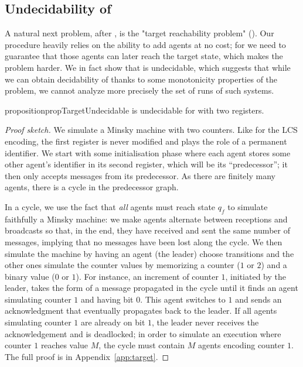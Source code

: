 \subsection{Undecidability of \TARGET}
\label{sec:undec-target}

A natural next problem, after \COVER, is the "target reachability problem" (\TARGET).  
Our \COVER procedure heavily relies on the ability to add agents at no cost; for \TARGET we need to guarantee that those agents can later reach the target state, which makes the problem harder. 
We in fact show that \TARGET is undecidable, which suggests that while we can obtain decidability of \COVER thanks to some monotonicity properties of the problem, we cannot analyze more precisely the set of runs of such systems.

\begin{restatable}{proposition}{propTargetUndecidable}
\label{prop:target-undec}
\TARGET is undecidable for \BNRA with two registers.
\end{restatable}

\begin{proof}[Proof sketch]
We simulate a Minsky machine with two counters. Like for the LCS encoding, the first register is never modified and plays the role of a permanent identifier. We start with some initialisation phase where each agent stores some other agent's identifier in its second register, which will be its ``predecessor''; it then only accepts messages from its predecessor. As there are finitely many agents, there is a cycle in the predecessor graph. 

In a cycle, we use the fact that \emph{all} agents must reach state $q_f$ to simulate faithfully a Minsky machine: we make agents alternate between receptions and broadcasts so that, in the end, they have received and sent the same number of messages, implying that no messages have been lost along the cycle.
We then simulate the machine by having an agent (the leader) choose transitions and the other ones simulate the counter values by memorizing a counter ($1$ or $2$) and a binary value ($0$ or $1$). For instance, an increment of counter $1$, initiated by the leader, takes the form of a message propagated in the cycle until it finds an agent simulating counter $1$ and having bit $0$. This agent switches to $1$ and sends an acknowledgment that eventually propagates back to the leader. If all agents simulating counter $1$ are already on bit $1$, the leader never receives the acknowledgement and is deadlocked; in order to simulate an execution where counter $1$ reaches value $M$, the cycle must contain $M$ agents encoding counter $1$. The full proof is in Appendix~\ref{app:target}. 
\end{proof}

